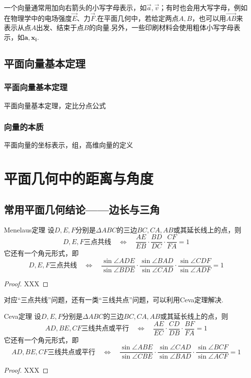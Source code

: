 \documentclass[lang=cn, zihao=4.5]{elegantbook}
\newcommand{\xl}[1]{\overrightarrow{#1}}
\begin{document}
一个向量通常用加向右箭头的小写字母表示，如$\xl{a},\xl{v}$；有时也会用大写字母，例如在物理学中的电场强度$\xl{E}$、力$\xl{F}$.在平面几何中，若给定两点$A,B$，也可以用$\xl{AB}$来表示从点$A$出发、结束于点$B$的向量.另外，一些印刷材料会使用粗体小写字母表示，如$\boldsymbol{a},\boldsymbol{x_i}$.

\section{平面向量基本定理}

\subsection{平面向量基本定理}

平面向量基本定理，定比分点公式

\subsection{向量的本质}

平面向量的坐标表示，组，高维向量的定义

\chapter{平面几何中的距离与角度}

\section{常用平面几何结论——边长与三角}

\begin{theorem}{Menelaus定理}
    设$D,E,F$分别是$\Delta ABC$的三边$BC,CA,AB$或其延长线上的点，则$$D,E,F \text{三点共线} \quad \Longleftrightarrow \quad \frac{AE}{EB} \cdot \frac{BD}{DC} \cdot \frac{CF}{FA} = 1$$
    它还有一个角元形式，即$$D,E,F \text{三点共线} \quad \Longleftrightarrow \quad \frac{\sin \angle ADE}{\sin \angle BDE} \cdot \frac{\sin \angle BAD}{\sin \angle CAD} \cdot \frac{\sin \angle CDF}{\sin \angle ADF} = 1$$
\end{theorem}
\begin{proof}
    XXX
\end{proof}

对应“三点共线”问题，还有一类“三线共点”问题，可以利用Ceva定理解决.

\begin{theorem}{Ceva定理}
    设$D,E,F$分别是$\Delta ABC$的三边$BC,CA,AB$或其延长线上的点，则$$AD,BE,CF \text{三线共点或平行} \quad \Longleftrightarrow \quad \frac{AE}{EC} \cdot \frac{CD}{DB} \cdot \frac{BF}{FA} = 1$$
    它还有一个角元形式，即$$AD,BE,CF \text{三线共点或平行} \quad \Longleftrightarrow \quad \frac{\sin \angle ABE}{\sin \angle CBE} \cdot \frac{\sin \angle CAD}{\sin \angle BAD} \cdot \frac{\sin \angle BCF}{\sin \angle ACF} = 1$$
\end{theorem}
\begin{proof}
    XXX
\end{proof}
\end{document}

